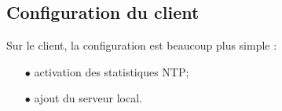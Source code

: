 \subsection{Configuration du client}
\label{subsec:configuration-client}

Sur le client, la configuration est beaucoup plus simple :
\begin{itemize}

    \item[$\bullet$] activation des statistiques NTP;
    \item[$\bullet$] ajout du serveur local.

\end{itemize}


